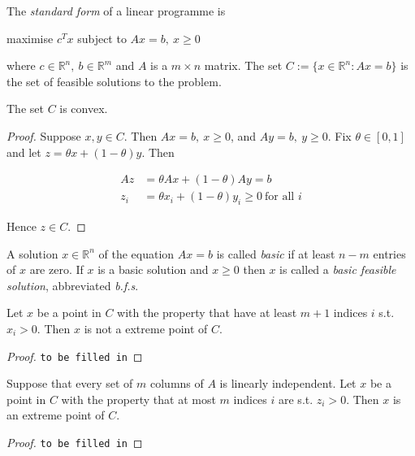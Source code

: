 \documentclass[a4paper]{article}
\begin{document}
\begin{defi}
  The \emph{standard form} of a linear programme is

  \begin{center}
    maximise $c^T x$ subject to $Ax = b,\: x\geq 0$
  \end{center}
  where $c \in \mathbb{R}^n,\: b \in \mathbb{R}^m$ and $A$ is a $m \times n$ matrix. The set $C := \{x \in \mathbb{R}^n: Ax = b\}$ is the set of feasible solutions to the problem.
\end{defi}

\begin{prop}
  The set $C$ is convex.
\end{prop}

\begin{proof}
  Suppose $x, y \in C$. Then $Ax = b,\: x \geq 0$, and $Ay = b,\: y \geq 0$. Fix $\theta \in [0, 1]$ and let $z = \theta x + (1 - \theta)y$. Then

  \begin{align*}
    Az &= \theta Ax + (1 - \theta) Ay = b \\
    z_i &= \theta x_i + (1 - \theta) y_i \geq 0 \: \text{for all } i
  \end{align*}

  Hence $z \in C$.
\end{proof}

A solution $x \in \mathbb{R}^n$ of the equation $Ax = b$ is called \emph{basic} if at least $n - m$ entries of $x$ are zero. If $x$ is a basic solution and $x \geq 0$ then $x$ is called a \emph{basic feasible solution}, abbreviated \emph{b.f.s}.

\begin{thm}
  Let $x$ be a point in $C$ with the property that have at least $m+1$ indices $i$ s.t. $x_i>0$. Then $x$ is not a extreme point of $C$.
\end{thm}

\begin{proof}
  \texttt{to be filled in}
\end{proof}

\begin{thm}
  Suppose that every set of $m$ columns of $A$ is linearly independent. Let $x$ be a point in $C$ with the property that at most $m$ indices $i$ are s.t. $z_i>0$. Then $x$ is an extreme point of $C$.
\end{thm}

\begin{proof}
  \texttt{to be filled in}
\end{proof}
\end{document}
